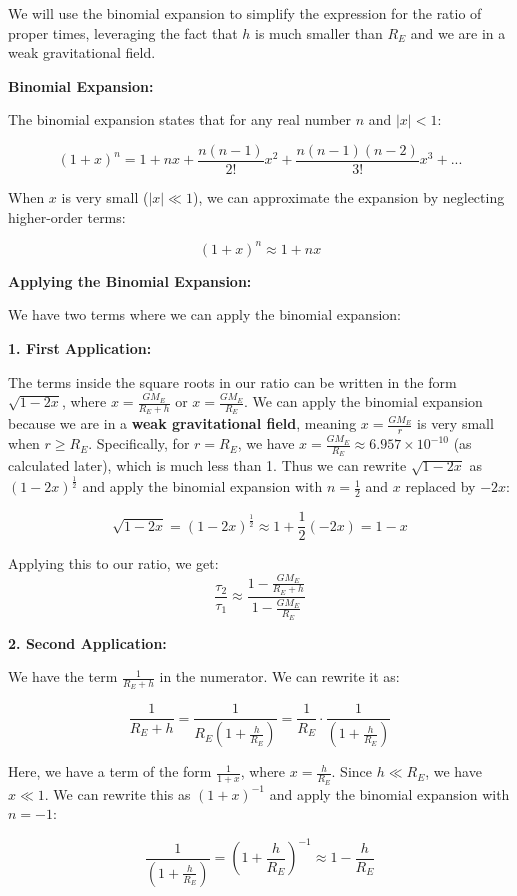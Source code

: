\documentclass{article}
\begin{document}
We will use the binomial expansion to simplify the expression for the ratio of proper times, leveraging the fact that \(h\) is much smaller than \(R_E\) and we are in a weak gravitational field.

\textbf{Binomial Expansion:}

The binomial expansion states that for any real number \(n\) and \(|x| < 1\):

\[ (1+x)^n = 1 + nx + \frac{n(n-1)}{2!}x^2 + \frac{n(n-1)(n-2)}{3!}x^3 + ... \]

When \(x\) is very small (\(|x| \ll 1\)), we can approximate the expansion by neglecting higher-order terms:

\[ (1+x)^n \approx 1 + nx \]

\textbf{Applying the Binomial Expansion:}

We have two terms where we can apply the binomial expansion:

\textbf{1. First Application:}

The terms inside the square roots in our ratio can be written in the form \(\sqrt{1 - 2x}\), where \(x = \frac{GM_E}{R_E + h}\) or \(x = \frac{GM_E}{R_E}\).  We can apply the binomial expansion because we are in a \textbf{weak gravitational field}, meaning \(x = \frac{GM_E}{r}\) is very small when \(r \geq R_E\). Specifically, for \(r = R_E\), we have \(x = \frac{GM_E}{R_E} \approx 6.957 \times 10^{-10}\) (as calculated later), which is much less than 1. Thus we can rewrite \(\sqrt{1 - 2x}\) as \((1 - 2x)^{\frac{1}{2}}\) and apply the binomial expansion with \(n = \frac{1}{2}\) and \(x\) replaced by \(-2x\):

\[
\sqrt{1 - 2x} = (1 - 2x)^{\frac{1}{2}} \approx 1 + \frac{1}{2}(-2x) = 1 - x
\]

Applying this to our ratio, we get:
\[
\frac{\tau_2}{\tau_1} \approx \frac{1 - \frac{GM_E}{R_E + h}}{1 - \frac{GM_E}{R_E}}
\]

\textbf{2. Second Application:}

We have the term \(\frac{1}{R_E + h}\) in the numerator. We can rewrite it as:

\[
\frac{1}{R_E + h} = \frac{1}{R_E(1 + \frac{h}{R_E})} = \frac{1}{R_E} \cdot \frac{1}{(1 + \frac{h}{R_E})}
\]

Here, we have a term of the form \(\frac{1}{1 + x}\), where \(x = \frac{h}{R_E}\). Since \(h \ll R_E\), we have \(x \ll 1\). We can rewrite this as \((1 + x)^{-1}\) and apply the binomial expansion with \(n = -1\):

\[
\frac{1}{(1 + \frac{h}{R_E})} = (1 + \frac{h}{R_E})^{-1} \approx 1 - \frac{h}{R_E}
\]
\end{document}
